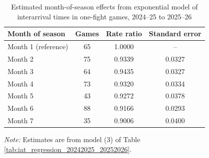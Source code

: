 \begin{table}[!h]
\centering
\caption{Estimated month-of-season effects from exponential model of interarrival times in one-fight games, 2024--25 to 2025--26}
\label{tab:month_effects_20242025_20252026}
\small
\renewcommand{\arraystretch}{1.12}
\setlength{\tabcolsep}{6pt}

\begin{tabular*}{0.75\textwidth}{@{\extracolsep{\fill}}lccc}
\toprule
Month of season & Games & Rate ratio & Standard error \\
\midrule
Month 1 (reference) & 65 & 1.0000 & -- \\
Month 2 & 75 & 0.9339 & 0.0327 \\
Month 3 & 64 & 0.9435 & 0.0327 \\
Month 4 & 73 & 0.9320 & 0.0334 \\
Month 5 & 43 & 0.9272 & 0.0378 \\
Month 6 & 88 & 0.9166 & 0.0293 \\
Month 7 & 35 & 0.9006 & 0.0400 \\
\bottomrule
\end{tabular*}

\vspace{0.4em}
\parbox{0.75\textwidth}{
\footnotesize
\textit{Note:} Estimates are from model (3) of Table \ref{tab:iat_regression_20242025_20252026}.
}
\end{table}
